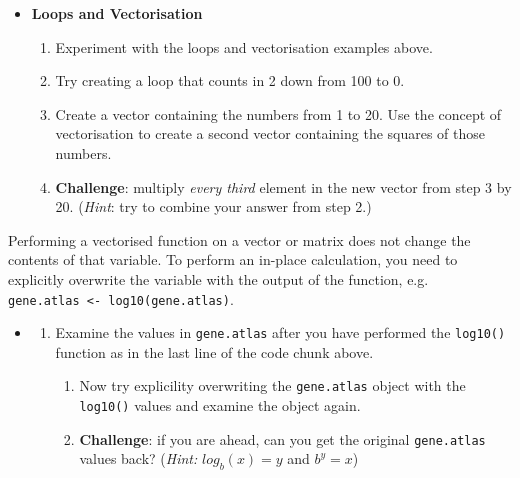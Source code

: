 \documentclass[a4paper]{book}
\providecommand{\tightlist}{%
  \setlength{\itemsep}{0pt}\setlength{\parskip}{0pt}}
\newenvironment{rmdblock}[1]
  {\vspace{1.5em}\begin{shaded*}
  \begin{itemize}
  \renewcommand{\labelitemi}{
    \raisebox{-.7\height}[0pt][0pt]{
      {\setkeys{Gin}{width=3em,keepaspectratio}\texttt{[image: images/\#1]}}
    }
  }
  \item
  }
  {
  \end{itemize}
  \end{shaded*}
  }
\newenvironment{rmdexercise}
  {\begin{rmdblock}{exercise}}
  {\end{rmdblock}}
\begin{document}
\begin{rmdexercise}
\textbf{Loops and Vectorisation}

\begin{enumerate}
\def\labelenumi{\arabic{enumi}.}
\item
  Experiment with the loops and vectorisation examples above.
\item
  Try creating a loop that counts in 2 down from 100 to 0.
\item
  Create a vector containing the numbers from 1 to 20. Use the concept
  of vectorisation to create a second vector containing the squares of
  those numbers.
\item
  \textbf{Challenge}: multiply \emph{every third} element in the new
  vector from step 3 by 20. (\emph{Hint}: try to combine your answer
  from step 2.)
\end{enumerate}
\end{rmdexercise}

Performing a vectorised function on a vector or matrix does not change
the contents of that variable. To perform an in-place calculation, you
need to explicitly overwrite the variable with the output of the
function, e.g. \texttt{gene.atlas\ \textless{}-\ log10(gene.atlas)}.

\begin{rmdexercise}
\begin{enumerate}
\def\labelenumi{\arabic{enumi}.}
\setcounter{enumi}{4}
\item
  Examine the values in \texttt{gene.atlas} after you have performed the
  \texttt{log10()} function as in the last line of the code chunk above.

  \begin{enumerate}
  \def\labelenumii{\alph{enumii})}
  \tightlist
  \item
    Now try explicility overwriting the \texttt{gene.atlas} object with
    the \texttt{log10()} values and examine the object again.
  \item
    \textbf{Challenge}: if you are ahead, can you get the original
    \texttt{gene.atlas} values back? (\emph{Hint:} \(log_b(x) = y\) and
    \(b^y = x\))
  \end{enumerate}
\end{enumerate}
\end{rmdexercise}
\end{document}
